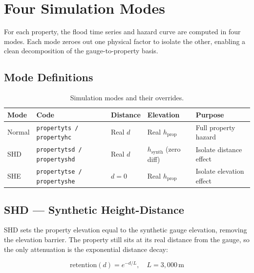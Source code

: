 \documentclass[11pt,a4paper]{article}
\begin{document}
\section{Four Simulation Modes}
\label{sec:four_modes}

For each property, the flood time series and hazard curve are computed in four modes.
Each mode zeroes out one physical factor to isolate the other, enabling a clean
decomposition of the gauge-to-property basis.

\subsection{Mode Definitions}

\begin{table}[H]
    \centering
    \caption{Simulation modes and their overrides.}
    \label{tab:modes}
    \begin{tabular}{llllp{5cm}}
        \toprule
        \textbf{Mode} & \textbf{Code} & \textbf{Distance} & \textbf{Elevation} & \textbf{Purpose} \\
        \midrule
        Normal     & \texttt{propertyts / propertyhc}   & Real $d$  & Real $h_{\text{prop}}$ & Full property hazard \\
        SHD        & \texttt{propertytsd / propertyshd}  & Real $d$  & $h_{\text{synth}}$ (zero diff) & Isolate distance effect \\
        SHE        & \texttt{propertytse / propertyshe}  & $d = 0$   & Real $h_{\text{prop}}$ & Isolate elevation effect \\
        \bottomrule
    \end{tabular}
\end{table}

\subsection{SHD --- Synthetic Height-Distance}

SHD sets the property elevation equal to the synthetic gauge elevation, removing the
elevation barrier. The property still sits at its real distance from the gauge, so the
only attenuation is the exponential distance decay:

\begin{equation}
    \text{retention}(d) = e^{-d / L}, \quad L = 3{,}000\,\text{m}
\end{equation}
\end{document}
